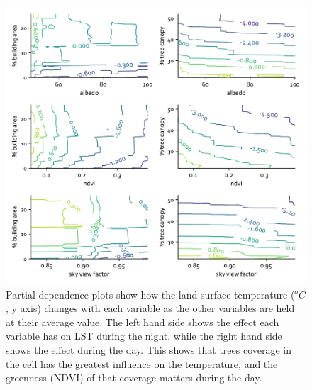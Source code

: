 \documentclass[final,3p,times,twocolumn,sort&compress]{elsarticle}
\begin{document}
\begin{figure}
    \centering
    \includegraphics[width=\linewidth]{fig/report/pdp_2d_night_500.pdf}
    \caption{
    Partial dependence plots show how the land surface temperature ($^oC$, y axis) changes with each variable as the other variables are held at their average value. The left hand side shows the effect each variable has on LST during the night, while the right hand side shows the effect during the day. This shows that trees coverage in the cell has the greatest influence on the temperature, and the greenness (NDVI) of that coverage matters during the day.
    }
    \label{fig:pdp_2dnight_500}
\end{figure}
\end{document}

